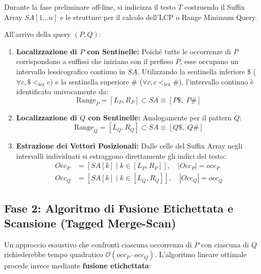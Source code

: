 Durante la fase preliminare off-line, si indicizza il testo $T$ costruendo il Suffix Array $SA[1 \dots n]$ e le strutture per il calcolo dell'LCP o Range Minimum Query.

All'arrivo della query $(P, Q)$:
\begin{enumerate}
  \item \textbf{Localizzazione di $P$ con Sentinelle:} Poich\'e tutte le occorrenze di $P$ corrispondono a suffissi che iniziano con il prefisso $P$, esse occupano un intervallo lessicografico continuo in $SA$. Utilizzando la sentinella inferiore $\$$ ($\forall c, \$ <_{\text{lex}} c$) e la sentinella superiore $\#$ ($\forall c, c <_{\text{lex}} \#$), l'intervallo continuo \`e identificato univocamente da:
  \begin{equation}
    \text{Range}_P = [L_P, R_P] \subset SA \equiv [P\$, \; P\#]
  \end{equation}
  \item \textbf{Localizzazione di $Q$ con Sentinelle:} Analogamente per il pattern $Q$:
  \begin{equation}
    \text{Range}_Q = [L_Q, R_Q] \subset SA \equiv [Q\$, \; Q\#]
  \end{equation}
  \item \textbf{Estrazione dei Vettori Posizionali:}
  Dalle celle del Suffix Array negli intervalli individuati si estraggono direttamente gli indici del testo:
  \begin{align}
    Occ_P &= [ SA[k] \mid k \in [L_P, R_P] ], \quad |Occ_P| = occ_P \\
    Occ_Q &= [ SA[k] \mid k \in [L_Q, R_Q] ], \quad |Occ_Q| = occ_Q
  \end{align}
\end{enumerate}

\FloatBarrier
\subsection{Fase 2: Algoritmo di Fusione Etichettata e Scansione (Tagged Merge-Scan)}
\label{subsec:fase2-tagged-merge-scan}

Un approccio esaustivo che confronti ciascuna occorrenza di $P$ con ciascuna di $Q$ richiederebbe tempo quadratico $\mathcal{O}(occ_P \cdot occ_Q)$. L'algoritmo lineare ottimale procede invece mediante \textbf{fusione etichettata}:

